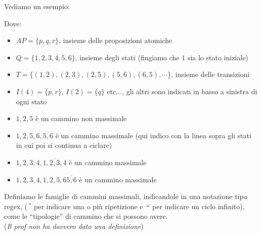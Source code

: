\begin{esempio}
  Vediamo un esempio:
  \begin{figure}[H]
    \centering
  \end{figure}
  Dove:
  \begin{itemize}
    \item $AP=\{p, q, r\}$, insieme delle proposizioni atomiche
    \item $Q=\{1, 2, 3, 4, 5, 6\}$, insieme degli stati (fingiamo che $1$ sia lo
    stato iniziale)
    \item $T=\{(1, 2),(2, 3),(2, 5),(5, 6),(6, 5),\cdots\}$, insieme delle
    transizioni 
    \item $I(4) =\{p, r\}$, $I(2) =\{q\}$ etc$\ldots$, gli altri sono indicati
    in basso a sinistra di ogni stato
    \item $1, 2, 5$ è un cammino non massimale
    \item $1, 2, 5, 6,\overline{5, 6}$ è un cammino massimale (qui indico con la
    linea sopra gli stati in cui poi si continua a ciclare)
    \item $1, 2, 3, 4,\overline{1, 2, 3, 4}$ è un cammino massimale
    \item $1, 2, 3, 4, 1, 2, 5, 6\overline{5, 6}$ è un cammino massimale
  \end{itemize}
\end{esempio}
\begin{definizione}
  Definiamo le famiglie di cammini massimali, indicandole in una notazione tipo
  regex, ($\,^*$ per indicare una o più ripetizione e $\,^\omega$ per indicare
  un ciclo infinito), come le ``tipologie'' di cammino che si possono avere.\\
  (\textit{Il prof non ha davvero dato una definizione})
\end{definizione}

